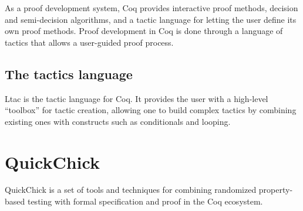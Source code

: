 As a proof development system, Coq provides interactive proof methods, decision and semi-decision algorithms, and a tactic language for letting the user define its own proof methods. Proof development in Coq is done through a language of tactics that allows a user-guided proof process.

\subsection{The tactics language}

Ltac is the tactic language for Coq. It provides the user with a high-level “toolbox” for tactic creation, allowing one to build complex tactics by combining existing ones with constructs such as conditionals and looping.

\section{QuickChick}

QuickChick is a set of tools and techniques for combining randomized property-based testing with formal specification and proof in the Coq ecosystem.